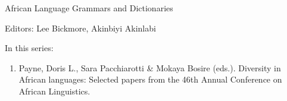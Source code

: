 {\large African Language Grammars and Dictionaries}

\bigskip

Editors:  Lee Bickmore,  Akinbiyi Akinlabi 


\bigskip

In this series:

\begin{enumerate}
\item Payne, Doris L., Sara Pacchiarotti \& Mokaya Bosire (eds.). Diversity in African languages: Selected papers from the 46th Annual Conference on African Linguistics.
\end{enumerate}


\vfill

